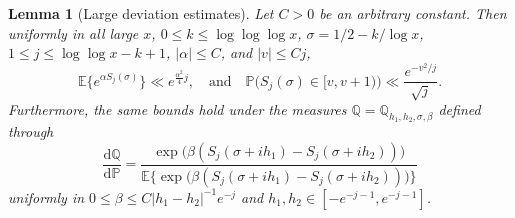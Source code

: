 \documentclass{amsart}
\newtheorem{lemma}[theorem]{Lemma}
\theoremstyle{definition}
\theoremstyle{remark}
\numberwithin{equation}{section}
\begin{document}
\begin{lemma}[Large deviation estimates]\label{lem:LDestimates} Let $C>0$ be an arbitrary constant. Then uniformly in all large $x$, $0\leq k\leq \log\log\log x$, $\sigma=1/2-k/\log x$, $1\leq j\leq \log\log x-k+1$, $|\alpha|\leq C$, and ${|v|\leq Cj}$,
\begin{equation}\label{eq:density}
        \mathbb{E}\big\{e^{\alpha S_j(\sigma)}\big\}\ll e^{\frac{\alpha^2}{4}j},\quad \mathrm{and} \quad \mathbb{P}\big(S_{j}(\sigma)\in [v,v+1)\big) \ll \frac{e^{-v^2/j}}{\sqrt{j}}.
\end{equation}
Furthermore, the same bounds hold under the measures $\mathbb{Q}=\mathbb{Q}_{h_1,h_2,\sigma,\beta}$ defined through
\[
    \frac{\mathrm{d}\mathbb{Q}}{\mathrm{d}\mathbb{P}}=\frac{\exp\big(\beta(S_j(\sigma+ih_1)-S_j(\sigma+ih_2))\big)}{\mathbb{E}\big\{\!\exp\big(\beta(S_j(\sigma+ih_1)-S_j(\sigma+ih_2))\big)\!\big\}}
\]
uniformly in $0\leq \beta\leq C|h_1-h_2|^{-1}e^{-j}$ and $h_1,h_2\in [-e^{-j-1},e^{-j-1}]$.
\end{lemma}
\end{document}

